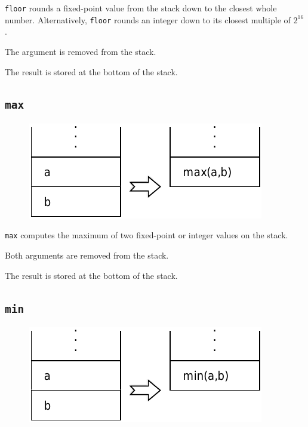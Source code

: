 			\texttt{floor} rounds a fixed-point value from the stack down to
			the closest whole number. Alternatively, \texttt{floor} rounds an
			integer down to its closest multiple of $2^{16}$.		
	
			The argument is removed from the stack.
			
			The result is stored at the bottom of the stack.
	
	\qquad
	
	\subsection*{\texttt{max}}
	
		\begin{figure}
			\begin{flushright}
				\includegraphics[width=\linewidth]{figure/pdf/i_max} 
			\end{flushright}
		\end{figure}
	
			\texttt{max} computes the maximum of two fixed-point or integer
			values on the stack. 
	
			Both arguments are removed from the stack. 
	
			The result is stored at the bottom of the stack.
	
	\qquad
	
	\subsection*{\texttt{min}}
	
		\begin{figure}
			\begin{flushright}
				\includegraphics[width=\linewidth]{figure/pdf/i_min} 
			\end{flushright}
		\end{figure}
	
